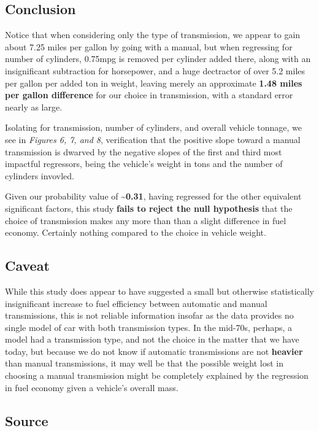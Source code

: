 \documentclass[]{article}
\begin{document}
\subsection{Conclusion}\label{conclusion}

Notice that when considering only the type of transmission, we appear to
gain about 7.25 miles per gallon by going with a manual, but when
regressing for number of cylinders, 0.75mpg is removed per cylinder
added there, along with an insignificant subtraction for horsepower, and
a huge dectractor of over 5.2 miles per gallon per added ton in weight,
leaving merely an approximate \textbf{1.48 miles per gallon difference}
for our choice in transmission, with a standard error nearly as large.

Isolating for transmission, number of cylinders, and overall vehicle
tonnage, we see in \emph{Figures 6, 7, and 8}, verification that the
positive slope toward a manual transmission is dwarved by the negative
slopes of the first and third most impactful regressors, being the
vehicle's weight in tons and the number of cylinders invovled.

Given our probability value of \textbf{\textasciitilde{}0.31}, having
regressed for the other equivalent significant factors, this study
\textbf{fails to reject the null hypothesis} that the choice of
transmission makes any more than than a slight difference in fuel
economy. Certainly nothing compared to the choice in vehicle weight.

\subsection{Caveat}\label{caveat}

While this study does appear to have suggested a small but otherwise
statistically insignificant increase to fuel efficiency between
automatic and manual transmissions, this is not reliable information
insofar as the data provides no single model of car with both
transmission types. In the mid-70s, perhaps, a model had a transmission
type, and not the choice in the matter that we have today, but because
we do not know if automatic transmissions are not \textbf{heavier} than
manual transmissions, it may well be that the possible weight lost in
choosing a manual transmission might be completely explained by the
regression in fuel economy given a vehicle's overall mass.

\subsection{Source}\label{source}
\end{document}
